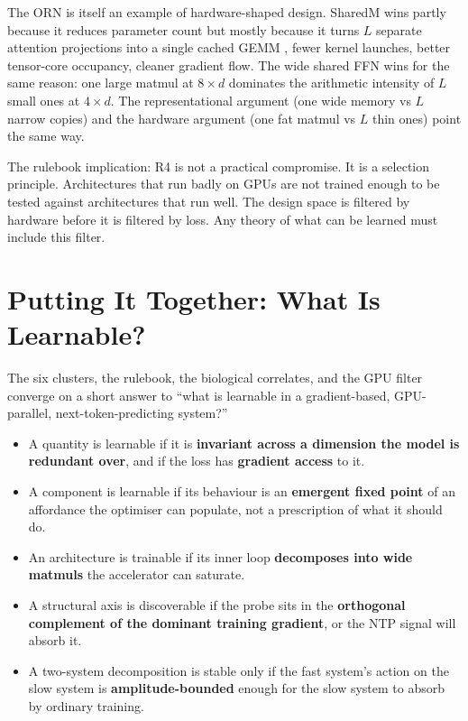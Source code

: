 \documentclass[11pt, a4paper]{article}
\begin{document}
The ORN is itself an example of hardware-shaped design. SharedM wins partly because it reduces parameter count but mostly because it turns $L$ separate attention projections into a single cached GEMM ,  fewer kernel launches, better tensor-core occupancy, cleaner gradient flow. The wide shared FFN wins for the same reason: one large matmul at $8\times d$ dominates the arithmetic intensity of $L$ small ones at $4\times d$. The representational argument (one wide memory vs $L$ narrow copies) and the hardware argument (one fat matmul vs $L$ thin ones) point the same way.

The rulebook implication: R4 is not a practical compromise. It is a selection principle. Architectures that run badly on GPUs are not trained enough to be tested against architectures that run well. The design space is filtered by hardware before it is filtered by loss. Any theory of what can be learned must include this filter.

\section{Putting It Together: What Is Learnable?}
\label{sec:learnable}

The six clusters, the rulebook, the biological correlates, and the GPU filter converge on a short answer to ``what is learnable in a gradient-based, GPU-parallel, next-token-predicting system?''

\begin{itemize}[nosep]
\item A quantity is learnable if it is \textbf{invariant across a dimension the model is redundant over}, and if the loss has \textbf{gradient access} to it.
\item A component is learnable if its behaviour is an \textbf{emergent fixed point} of an affordance the optimiser can populate, not a prescription of what it should do.
\item An architecture is trainable if its inner loop \textbf{decomposes into wide matmuls} the accelerator can saturate.
\item A structural axis is discoverable if the probe sits in the \textbf{orthogonal complement of the dominant training gradient}, or the NTP signal will absorb it.
\item A two-system decomposition is stable only if the fast system's action on the slow system is \textbf{amplitude-bounded} enough for the slow system to absorb by ordinary training.
\end{itemize}
\end{document}
